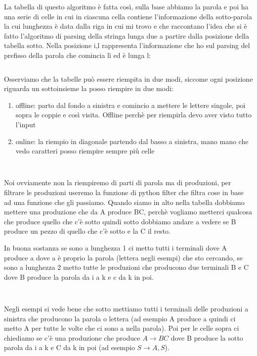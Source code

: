 La tabella di questo algoritmo è fatta così, sulla base abbiamo la parola e poi ha una serie di celle in cui in ciascuna cella contiene l'informazione della sotto-parola la cui lunghezza è data dalla riga in cui mi trovo e che raccontano l'idea che si è fatto l'algoritmo di parsing della stringa lunga due a partire dalla posizione della tabella sotto. Nella posizione i,l rappresenta l'informazione che ho sul parsing del prefisso della parola che comincia lì ed è lunga l:
\begin{lstlisting}

\end{lstlisting}

Osserviamo che la tabelle può essere riempita in due modi, siccome ogni posizione riguarda un sottoinsieme la posso riempire in due modi:
\begin{enumerate}
    \item offline: parto dal fondo a sinistra e comincio a mettere le lettere singole, poi sopra le coppie e così visita. Offline perchè per riempirla devo aver visto tutto l'input
    \item online: la riempio in diagonale partendo dal basso a sinistra, mano mano che vedo caratteri posso riempire sempre più celle
\end{enumerate}

\begin{lstlisting}
    
\end{lstlisting}
Noi ovviamente non la riempiremo di parti di parola ma di produzioni, per filtrare le produzioni useremo la funzione di python filter che filtra cose in base ad una funzione che gli passiamo.
Quando siamo in alto nella tabella dobbiamo mettere una produzione che da A produce BC, perchè vogliamo metterci qualcosa che produce quello che c'è sotto quindi sotto dobbiamo andare a vedere se B produce un pezzo di quello che c'è sotto e la C il resto.

In buona sostanza se sono a lunghezza 1 ci metto tutti i terminali dove A produce a dove a è proprio la parola (lettera negli esempi) che sto cercando, se sono a lunghezza 2 metto tutte le produzioni che producono due terminali B e C dove B produce la parola da i a k e c da k in poi.
\begin{lstlisting}
    
\end{lstlisting}

Negli esempi si vede bene che sotto mettiamo tutti i terminali delle produzioni a sinistra che producono la parola o lettera (ad esempio A produce a quindi ci metto A per tutte le volte che ci sono a nella parola). Poi per le celle sopra ci chiediamo se c'è una produzione che produce $A \rightarrow BC$ dove B produce la sotto parola da i a k e C da k in poi (ad esempio $S \rightarrow A, S$).

